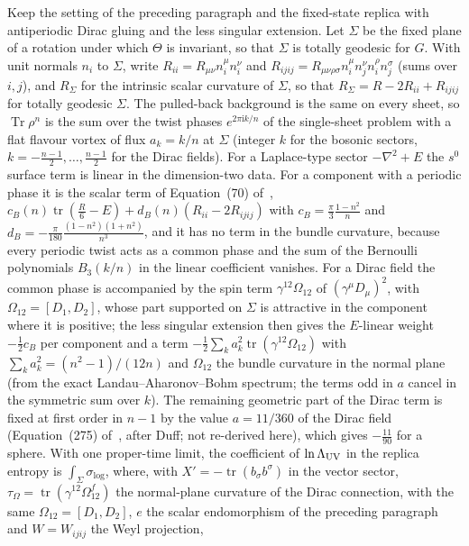 Keep the setting of the preceding paragraph and the fixed-state replica with antiperiodic Dirac gluing and the less singular extension. Let \(\Sigma\) be the fixed plane of a rotation under which \(\Theta\) is invariant, so that \(\Sigma\) is totally geodesic for \(G\). With unit normals \(n_i\) to \(\Sigma\), write \(R_{ii}=R_{\mu\nu}n^\mu_in^\nu_i\) and \(R_{ijij}=R_{\mu\nu\rho\sigma}n^\mu_in^\nu_jn^\rho_in^\sigma_j\) (sums over \(i,j\)), and \(R_\Sigma\) for the intrinsic scalar curvature of \(\Sigma\), so that \(R_\Sigma=R-2R_{ii}+R_{ijij}\) for totally geodesic \(\Sigma\). The pulled-back background is the same on every sheet, so \(\operatorname{Tr}\rho^n\) is the sum over the twist phases \(e^{2\pi\mathrm ik/n}\) of the single-sheet problem with a flat flavour vortex of flux \(a_k=k/n\) at \(\Sigma\) (integer \(k\) for the bosonic sectors, \(k=-\tfrac{n-1}2,\dots,\tfrac{n-1}2\) for the Dirac fields). For a Laplace-type sector \(-\nabla^2+E\) the \(s^0\) surface term is linear in the dimension-two data. For a component with a periodic phase it is the scalar term of Equation~(70) of~\cite{Solodukhin2011}, \(c_B(n)\operatorname{tr}(\tfrac R6-E)+d_B(n)(R_{ii}-2R_{ijij})\) with \(c_B=\tfrac\pi3\tfrac{1-n^2}n\) and \(d_B=-\tfrac\pi{180}\tfrac{(1-n^2)(1+n^2)}{n^3}\), and it has no term in the bundle curvature, because every periodic twist acts as a common phase and the sum of the Bernoulli polynomials \(B_3(k/n)\) in the linear coefficient vanishes. For a Dirac field the common phase is accompanied by the spin term \(\gamma^{12}\Omega_{12}\) of \((\gamma^\mu D_\mu)^2\), with \(\Omega_{12}=[D_1,D_2]\), whose part supported on \(\Sigma\) is attractive in the component where it is positive; the less singular extension then gives the \(E\)-linear weight \(-\tfrac12c_B\) per component and a term \(-\tfrac12\sum_ka_k^2\operatorname{tr}(\gamma^{12}\Omega_{12})\) with \(\sum_ka_k^2=(n^2-1)/(12n)\) and \(\Omega_{12}\) the bundle curvature in the normal plane (from the exact Landau--Aharonov--Bohm spectrum; the terms odd in \(a\) cancel in the symmetric sum over \(k\)). The remaining geometric part of the Dirac term is fixed at first order in \(n-1\) by the value \(a=11/360\) of the Dirac field (Equation~(275) of~\cite{Solodukhin2011}, after Duff; not re-derived here), which gives \(-\tfrac{11}{90}\) for a sphere. With one proper-time limit, the coefficient of \(\ln\Lambda_{\mathrm{UV}}\) in the replica entropy is \(\int_\Sigma\sigma_{\log}\), where, with \(X'=-\operatorname{tr}(b_\sigma b^\sigma)\) in the vector sector, \(\tau_\Omega=\operatorname{tr}(\gamma^{12}\Omega^{f}_{12})\) the normal-plane curvature of the Dirac connection, with the same \(\Omega_{12}=[D_1,D_2]\), \(e\) the scalar endomorphism of the preceding paragraph and \(W=W_{ijij}\) the Weyl projection,

